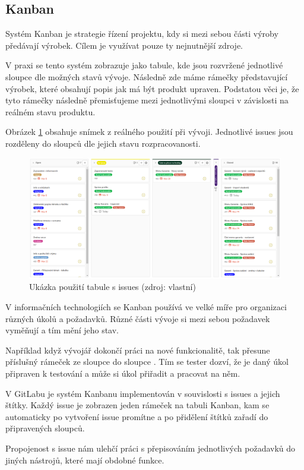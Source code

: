 \documentclass[czech,BP]{thesiskiv}
\begin{document}
\subsection{Kanban}
	\par Systém Kanban je strategie řízení projektu, kdy si mezi sebou části výroby předávají výrobek. Cílem je využívat pouze ty nejnutnější zdroje.
	\par V praxi se tento systém zobrazuje jako tabule, kde jsou rozvržené jednotlivé sloupce dle možných stavů vývoje. Následně zde máme rámečky představující výrobek, které obsahují popis jak má být produkt upraven. Podstatou věci je, že tyto rámečky následně přemisťujeme mezi jednotlivými sloupci v závislosti na reálném stavu produktu.
	\par Obrázek \ref{fig:kanban} obsahuje snímek z reálného použití při vývoji. Jednotlivé issues jsou rozděleny do sloupců dle jejich stavu rozpracovanosti.
	\begin{figure}[H]
		\centering
		\includegraphics[width=\textwidth]{img/rizeni_projektu/kanban}
		\caption{Ukázka použití tabule s issues (zdroj: vlastní)}
		\label{fig:kanban}
	\end{figure}
	\par V informačních technologiích se Kanban používá ve velké míře pro organizaci různých úkolů a požadavků. Různé části vývoje si mezi sebou požadavek vyměňují a tím mění jeho stav.
	\par Například když vývojář dokončí práci na nové funkcionalitě, tak přesune příslušný rámeček ze sloupce  do sloupce . Tím se tester dozví, že je daný úkol připraven k testování a může si úkol přiřadit a pracovat na něm.
	\par V GitLabu je systém Kanbanu implementován v souvislosti s issues a jejich štítky. Každý issue je zobrazen jeden rámeček na tabuli Kanban, kam se automaticky po vytvoření issue promítne a po přidělení štítků zařadí do připravených sloupců.
	\par Propojenost s issue nám ulehčí práci s přepisováním jednotlivých požadavků do jiných nástrojů, které mají obdobné funkce.
\end{document}
